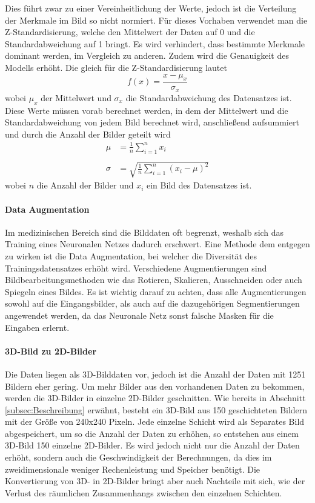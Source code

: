 Dies führt zwar zu einer Vereinheitlichung der Werte, jedoch ist die Verteilung der Merkmale im Bild so nicht normiert. Für dieses Vorhaben verwendet man die Z-Standardisierung, welche den Mittelwert der Daten auf 0 und die Standardabweichung auf 1 bringt. Es wird verhindert, dass bestimmte Merkmale dominant werden, im Vergleich zu anderen. Zudem wird die Genauigkeit des \glspl{Modell} erhöht.\cite[vgl.][]{Goodfellow2016} Die gleich für die Z-Standardisierung lautet
\begin{equation}
	f(x)=\frac{x - \mu_x}{\sigma_x}
\end{equation}
wobei $\mu_x$ der Mittelwert und $\sigma_x$ die Standardabweichung des Datensatzes ist. Diese Werte müssen vorab berechnet werden, in dem der Mittelwert und die Standardabweichung von jedem Bild berechnet wird, anschließend aufsummiert und durch die Anzahl der Bilder geteilt wird
\begin{equation}
	\begin{aligned}
		\mu &= \frac{1}{n}\sum_{i=1}^{n}x_i \\ \\
		\sigma &= \sqrt{\frac{1}{n}\sum_{i=1}^{n}(x_i - \mu)^2}
	\end{aligned}
\end{equation}
wobei $n$ die Anzahl der Bilder und $x_i$ ein Bild des Datensatzes ist.

\paragraph{Data Augmentation} 
Im medizinischen Bereich sind die Bilddaten oft begrenzt, weshalb sich das Training eines Neuronalen Netzes dadurch erschwert. Eine Methode dem entgegen zu wirken ist die Data Augmentation, bei welcher die Diversität des Trainingsdatensatzes erhöht wird. Verschiedene Augmentierungen sind Bildbearbeitungsmethoden wie das Rotieren, Skalieren, Ausschneiden oder auch Spiegeln eines Bildes. Es ist wichtig darauf zu achten, dass alle Augmentierungen sowohl auf die Eingangsbilder, als auch auf die dazugehörigen Segmentierungen angewendet werden, da das Neuronale Netz sonst falsche Masken für die Eingaben erlernt. \cite[vgl.][]{Shorten2019}

\paragraph{3D-Bild zu 2D-Bilder} 
Die Daten liegen als 3D-Bilddaten vor, jedoch ist die Anzahl der Daten mit 1251 Bildern eher gering. Um mehr Bilder aus den vorhandenen Daten zu bekommen, werden die 3D-Bilder in einzelne 2D-Bilder geschnitten. Wie bereits in Abschnitt \ref{subsec:Beschreibung} erwähnt, besteht ein 3D-Bild aus 150 geschichteten Bildern mit der Größe von 240x240 Pixeln. Jede einzelne Schicht wird als Separates Bild abgespeichert, um so die Anzahl der Daten zu erhöhen, so entstehen aus einem 3D-Bild 150 einzelne 2D-Bilder. Es wird jedoch nicht nur die Anzahl der Daten erhöht, sondern auch die Geschwindigkeit der Berechnungen, da dies im zweidimensionale weniger Rechenleistung und Speicher benötigt. Die Konvertierung von 3D- in 2D-Bilder bringt aber auch Nachteile mit sich, wie der Verlust des räumlichen Zusammenhangs zwischen den einzelnen Schichten. \cite[vgl.][]{Stevens2020}

